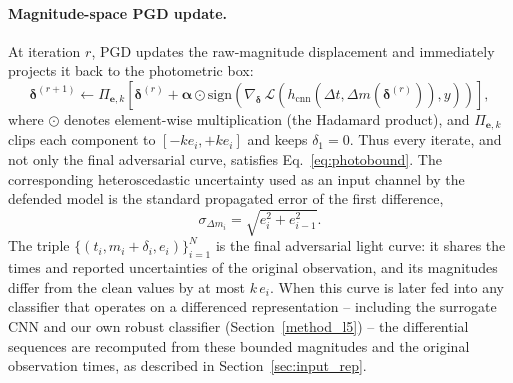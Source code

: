 \documentclass{aa}
\begin{document}
\paragraph{Magnitude-space PGD update.}
At iteration $r$, PGD updates the raw-magnitude displacement and immediately projects it back to the photometric box:
\begin{equation}
\boldsymbol{\delta}^{(r+1)}
\leftarrow
\Pi_{\mathbf{e},k}\!\left[
\boldsymbol{\delta}^{(r)} +
\boldsymbol{\alpha}\odot
\mathrm{sign}\!\left(
\nabla_{\boldsymbol{\delta}}\,
\mathcal{L}\!\left(
h_{\mathrm{cnn}}(\Delta t,\Delta m(\boldsymbol{\delta}^{(r)})), y
\right)
\right)
\right],
\end{equation}
where $\odot$ denotes element-wise multiplication (the Hadamard
product), and $\Pi_{\mathbf{e},k}$ clips each component to
$[-k e_i,+k e_i]$ and keeps $\delta_1=0$. Thus every iterate, and not only
the final adversarial curve, satisfies Eq.~\eqref{eq:photobound}. The
corresponding heteroscedastic uncertainty used as an input channel by the
defended model is the standard propagated error of the first difference,
\begin{equation}
\label{eq:prop_err}
\sigma_{\Delta m_i} = \sqrt{e_i^2 + e_{i-1}^2}.
\end{equation}
The triple $\{(t_i, m_i+\delta_i, e_i)\}_{i=1}^{N}$ is the final adversarial light curve: it shares the times and reported uncertainties of the original observation, and its magnitudes differ from the clean values by at most $k\,e_i$. When this curve is later fed into any classifier that operates on a differenced representation -- including the surrogate CNN and our own robust classifier (Section~\ref{method_l5}) -- the differential sequences are recomputed from these bounded magnitudes and the original observation times, as described in Section~\ref{sec:input_rep}.
\end{document}
